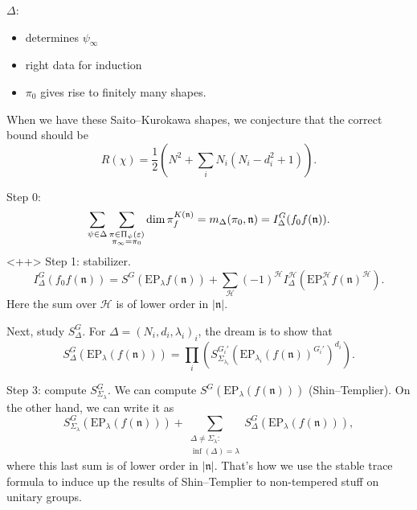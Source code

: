 \documentclass[reqno]{amsart} 
\begin{document}
$\Delta $:
\begin{itemize}
\item determines $\psi _\infty $
\item right data for induction
\item $\pi_0 $ gives rise to finitely many shapes.
\end{itemize}

\begin{remark}
  When we have these Saito--Kurokawa shapes, we conjecture that the correct bound should be
  \begin{equation*}
    R(\chi) = \frac{1}{2} \left( N^2 + \sum_i N_i (N_i - d_i^2 + 1) \right).
  \end{equation*}
\end{remark}

Step 0:
\begin{equation*}
  \sum_{\psi \in \Delta } \sum_{
    \substack{
      \pi \in \Pi_\psi (\varepsilon )  \\
       \pi _\infty = \pi_0 
    }
  }
  \dim \pi_f^{K (\mathfrak{n} )}
  =
  m_\Delta (\pi_0, \mathfrak{n} ) = I_\Delta^G (f_0 f (\mathfrak{n} )).
\end{equation*}<++>
Step 1: stabilizer.
\begin{equation*}
  I_\Delta^G (f_0 f (\mathfrak{n} )) = S^G (\mathrm{EP}_\lambda f (\mathfrak{n} ) )
  + \sum_{\mathcal{H} } (- 1 )^{\mathcal{H} } I_{\Delta}^{\mathcal{H} }
  \left( \mathrm{EP}_\lambda^{\mathcal{H} } f (\mathfrak{n} )^{\mathcal{H} } \right).
\end{equation*}
Here the sum over $\mathcal{H}$ is of lower order in $\lvert \mathfrak{n} \rvert$.



Next, study $S_\Delta^G $.  For $\Delta = (N_i, d_i, \lambda_i )_i $, the dream is to show that
\begin{equation*}
  S_\Delta^G (\mathrm{EP}_\lambda (f (\mathfrak{n} )))
  = \prod_i \left( S_{\Sigma_{\lambda_i }}^{G_i '}
    \left( \mathrm{EP}_{\lambda_i } (f (\mathfrak{n} ))^{G_i '} \right)^{d_i } \right).
\end{equation*}

Step 3: compute $S_{\Sigma_\lambda }^{G}$.
We can compute $S^G (\mathrm{EP}_\lambda (f (\mathfrak{n} )))$ (Shin--Templier).  On the other hand, we can write it as
\begin{equation*}
  S_{\Sigma_\lambda }^G (\mathrm{EP}_\lambda (f (\mathfrak{n} )))
  + \sum_{
    \substack{
      \Delta \neq \Sigma_\lambda :  \\
       \inf (\Delta ) = \lambda 
    }
  }
  S_\Delta^G (\mathrm{EP}_\lambda (f (\mathfrak{n} ))),
\end{equation*}
where this last sum is of lower order in $\lvert \mathfrak{n} \rvert$.  That's how we use the stable trace formula to induce up the results of Shin--Templier to non-tempered stuff on unitary groups.
\end{document}
